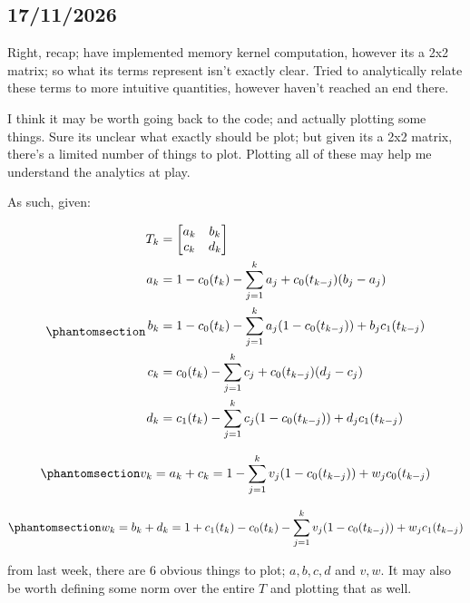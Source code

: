 \documentclass[
  letterpaper,
  DIV=11,
  numbers=noendperiod]{scrartcl}
\author{}
\date{}
\begin{document}
\subsection{17/11/2026}\label{section}

Right, recap; have implemented memory kernel computation, however its a
2x2 matrix; so what its terms represent isn't exactly clear. Tried to
analytically relate these terms to more intuitive quantities, however
haven't reached an end there.

I think it may be worth going back to the code; and actually plotting
some things. Sure its unclear what exactly should be plot; but given its
a 2x2 matrix, there's a limited number of things to plot. Plotting all
of these may help me understand the analytics at play.

As such, given:

\begin{equation}\phantomsection\label{eq-tensorMapRelation}{
\begin{align}
T_{k} &= \begin{bmatrix} a_{k} & b_{k} \\ c_{k} & d_{k} \end{bmatrix} \\
a_{k}&=1-c_{0}(t_{k})-\sum_{j=1}^{k}a_{j}+c_{0}(t_{k-j})(b_{j}-a_{j}) \\
b_{k}&=1-c_{0}(t_{k})-\sum_{j=1}^{k}a_{j}(1-c_{0}(t_{k-j}))+b_{j}c_{1}(t_{k-j}) \\
c_{k}&=c_{0}(t_{k})-\sum_{j=1}^{k}c_{j}+c_{0}(t_{k-j})(d_{j}-c_{j}) \\
d_{k}&=c_{1}(t_{k})-\sum_{j=1}^{k}c_{j}(1-c_{0}(t_{k-j}))+d_{j}c_{1}(t_{k-j}) \\
\end{align}
}\end{equation}

\begin{equation}\phantomsection\label{eq-tensorMapSubstitution1_v}{
v_{k}=a_{k}+c_{k}=1-\sum_{j=1}^{k}v_{j}(1-c_{0}(t_{k-j}))+w_{j}c_{0}(t_{k-j})
}\end{equation}

\begin{equation}\phantomsection\label{eq-tensorMapSubstitution1_w}{
w_{k}=b_{k}+d_{k}=1+c_{1}(t_{k})-c_{0}(t_{k}) - \sum_{j=1}^{k}v_{j}(1-c_{0}(t_{k-j}))+w_{j}c_{1}(t_{k-j})
}\end{equation}

from last week, there are 6 obvious things to plot; \(a,b,c,d\) and
\(v,w\). It may also be worth defining some norm over the entire \(T\)
and plotting that as well.
\end{document}
